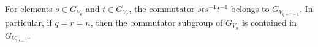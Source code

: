 For elements $s \in G_{V_q}$ and $t \in G_{V_r}$, the commutator $sts^{-1}t^{-1}$ belongs to $G_{V_{q+r-1}}$. In particular, if $q = r = n$, then the commutator subgroup of $G_{V_n}$ is contained in $G_{V_{2n-1}}$.
